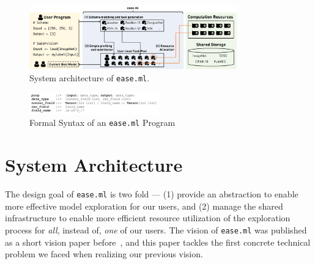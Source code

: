 \documentclass[letterpaper]{vldb}
\newcommand{\eml}{\texttt{ease.ml}\xspace}
\begin{document}
\begin{figure}
\centering
\includegraphics[width=0.8\textwidth]{figures/easeml}
\vspace{-1em}
\caption{System architecture of \texttt{ease.ml}.}
\label{fig:architecture}
\vspace{-1em}
\end{figure}


\begin{figure}[t]
\centering
\includegraphics[width=0.5\textwidth]{figures/syntax}
\vspace{-2em}
\caption{Formal Syntax of an \eml Program}
\label{fig:syntax}
\vspace{-1em}
\end{figure}



\vspace{-1em}
\section{System Architecture} \label{sec:architecture}

The design goal of \eml is two fold --- (1) provide an abstraction
to enable more effective model exploration for our users, and 
(2) manage the shared infrastructure to enable more efficient
resource utilization of the exploration process 
for {\em all}, instead of, {\em one} of our users.
The vision of \eml was published as a short vision paper
before~\cite{HILDA}, and this paper tackles the first
concrete technical problem we faced when realizing our
previous vision.
\end{document}
